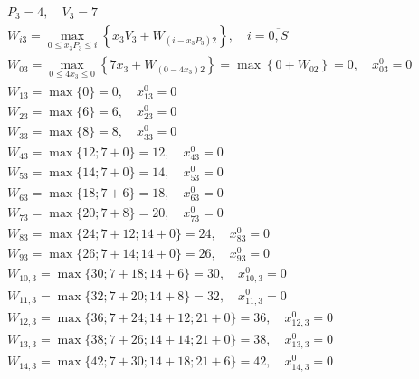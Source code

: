 \begin{align*}
     & P_3 = 4, \quad V_3 = 7                                                                                                                   \\
     & W_{i3} = \max\limits_{0 \leq x_3P_3 \leq i} \left\{x_3V_3 + W_{(i - x_3P_3)2}\right\}, \quad i = \overline{0, S}                         \\
     & W_{03} = \max\limits_{0 \leq 4x_3 \leq 0} \left\{7x_3 + W_{(0 - 4x_3)2}\right\} = \max \left\{0 + W_{02}\right\} = 0, \quad x_{03}^0 = 0 \\
     & W_{13} = \max \{0\} = 0, \quad x_{13}^0 = 0                                                                                              \\
     & W_{23} = \max \{6\} = 6, \quad x_{23}^0 = 0                                                                                              \\
     & W_{33} = \max \{8\} = 8, \quad x_{33}^0 = 0                                                                                              \\
     & W_{43} = \max \{12; 7 + 0\} = 12, \quad x_{43}^0 = 0                                                                                     \\
     & W_{53} = \max \{14; 7 + 0\} = 14, \quad x_{53}^0 = 0                                                                                     \\
     & W_{63} = \max \{18; 7 + 6\} = 18, \quad x_{63}^0 = 0                                                                                     \\
     & W_{73} = \max \{20; 7 + 8\} = 20, \quad x_{73}^0 = 0                                                                                     \\
     & W_{83} = \max \{24; 7 + 12; 14 + 0\} = 24, \quad x_{83}^0 = 0                                                                            \\
     & W_{93} = \max \{26; 7 + 14; 14 + 0\} = 26, \quad x_{93}^0 = 0                                                                            \\
     & W_{10, 3} = \max \{30; 7 + 18; 14 + 6\} = 30, \quad x_{10, 3}^0 = 0                                                                      \\
     & W_{11, 3} = \max \{32; 7 + 20; 14 + 8\} = 32, \quad x_{11, 3}^0 = 0                                                                      \\
     & W_{12, 3} = \max \{36; 7 + 24; 14 + 12; 21 + 0\} = 36, \quad x_{12, 3}^0 = 0                                                             \\
     & W_{13, 3} = \max \{38; 7 + 26; 14 + 14; 21 + 0\} = 38, \quad x_{13, 3}^0 = 0                                                             \\
     & W_{14, 3} = \max \{42; 7 + 30; 14 + 18; 21 + 6\} = 42, \quad x_{14, 3}^0 = 0
\end{align*}

